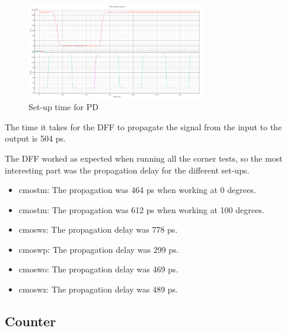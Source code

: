 \documentclass[a4paper,12pt]{article} \usepackage{graphicx}
\begin{document}
\begin{figure}[h]
\centering
\includegraphics[width=0.7\textwidth]{../Bilder/set_up_PD.png}
\caption{Set-up time for PD}
\label{fig:set_up_PD}
\end{figure}

The time it takes for the DFF to propagate the signal from the input to the output is 504 ps.

The DFF worked as expected when running all the corner tests, so the most interesting part was the propagation delay for
the different set-ups.

\begin{itemize}
        \item cmostm: The propagation was 464 ps when working at 0 degrees.
        \item cmostm: The propagation was 612 ps when working at 100 degrees.
        \item cmosws: The propagation delay was 778 ps.
        \item cmoswp: The propagation delay was 299 ps.
        \item cmoswo: The propagation delay was 469 ps.
        \item cmoswz: The propagation delay was 489 ps.
\end{itemize}

\subsection{Counter}
\end{document}
